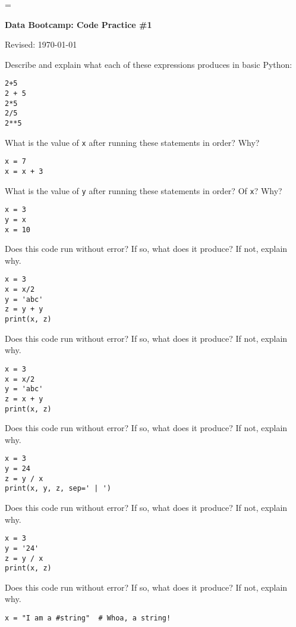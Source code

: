 \documentclass[11pt]{exam}
\begin{document}
\parskip=\bigskipamount
\parindent=0.0in
\thispagestyle{empty}


\bigskip\bigskip
\centerline{\Large \bf Data Bootcamp:  Code Practice \#1}
\centerline{Revised: \today}


\begin{questions}
\item Describe and explain what each of these expressions produces in basic Python: 
\begin{verbatim}
2+5
2 + 5
2*5 
2/5 
2**5
\end{verbatim}

\item What is the value of \texttt{x} after running these statements in order? Why?
\begin{verbatim}
x = 7
x = x + 3
\end{verbatim}

\item What is the value of \texttt{y} after running these statements in order? 
Of \texttt{x}?  Why?
\begin{verbatim}
x = 3
y = x
x = 10
\end{verbatim}

\item Does this code run without error?  If so, what does it produce?  If not, explain why.
\begin{verbatim}
x = 3
x = x/2
y = 'abc'
z = y + y 
print(x, z)
\end{verbatim}

\item Does this code run without error?  If so, what does it produce?  If not, explain why.  
\begin{verbatim}
x = 3
x = x/2
y = 'abc'
z = x + y 
print(x, z)
\end{verbatim}

\item Does this code run without error?  If so, what does it produce?  If not, explain why.
\begin{verbatim}
x = 3
y = 24
z = y / x
print(x, y, z, sep=' | ')
\end{verbatim}

\item Does this code run without error?  If so, what does it produce?  If not, explain why.
\begin{verbatim}
x = 3
y = '24'
z = y / x
print(x, z) 
\end{verbatim}

\item Does this code run without error?  If so, what does it produce?  If not, explain why.
\begin{verbatim}
x = "I am a #string"  # Whoa, a string!
\end{verbatim}


\end{questions}
\end{document}
